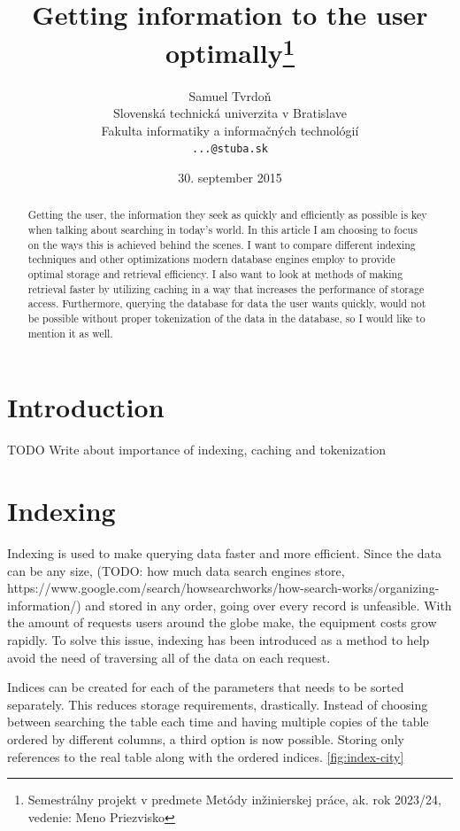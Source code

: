 \documentclass[10pt,a4paper]{article}
\title{Getting information to the user optimally\thanks{Semestrálny projekt v predmete Metódy inžinierskej práce, ak. rok 2023/24, vedenie: Meno Priezvisko}} %
\author{Samuel Tvrdoň\\[2pt]
	{\small Slovenská technická univerzita v Bratislave}\\
	{\small Fakulta informatiky a informačných technológií}\\
	{\small \texttt{...@stuba.sk}}
	}
\date{\small 30. september 2015} %
\begin{document}
\maketitle

\begin{abstract}
Getting the user, the information they seek as quickly and efficiently as possible is key when talking about searching in today’s world. In this article I am choosing to focus on the ways this is achieved behind the scenes. I want to compare different indexing techniques and other optimizations modern database engines employ to provide optimal storage and retrieval efficiency. I also want to look at methods of making retrieval faster by utilizing caching in a way that increases the performance of storage access. Furthermore, querying the database for data the user wants quickly, would not be possible without proper tokenization of the data in the database, so I would like to mention it as well.
\end{abstract}

\section{Introduction}
\cite{Database-indexing:-yesterday-and-today}
TODO Write about importance of indexing, caching and tokenization

\section{Indexing}


Indexing is used to make querying data faster and more efficient. Since the data can be any size, (TODO: how much data search engines store, https://www.google.com/search/howsearchworks/how-search-works/organizing-information/) and stored in any order, going over every record is unfeasible. With the amount of requests users around the globe make, the equipment costs grow rapidly. To solve this issue, indexing has been introduced as a method to help avoid the need of traversing all of the data on each request.

Indices can be created for each of the parameters that needs to be sorted separately. This reduces storage requirements, drastically. Instead of choosing between searching the table each time and having multiple copies of the table ordered by different columns, a third option is now possible. Storing only references to the real table along with the ordered indices. \ref{fig:index-city}
\end{document}
